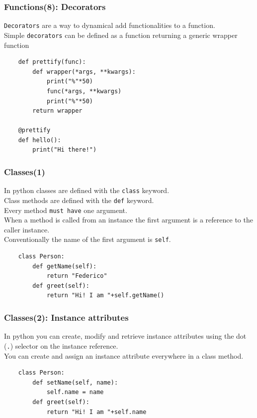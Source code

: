 \documentclass{beamer}
\begin{document}
\begin{frame}[fragile]
    \frametitle{Functions(8): Decorators}
    \texttt{Decorators} are a way to dynamical add functionalities to a function.\\
    Simple \texttt{decorators} can be defined as a function returning a generic wrapper function\\
    \begin{verbatim}
    def prettify(func):
        def wrapper(*args, **kwargs):
            print("%"*50)
            func(*args, **kwargs)
            print("%"*50)
        return wrapper

    @prettify
    def hello():
        print("Hi there!")
    \end{verbatim}
\end{frame}

\begin{frame}[fragile]
    \frametitle{Classes(1)}
    In python classes are defined with the \texttt{class} keyword.\\
    Class methods are defined with the \texttt{def} keyword.\\
    Every method \texttt{must have} one argument.\\
    When a method is called from an instance the first argument is a reference to the caller instance.\\
    Conventionally the name of the first argument is \texttt{self}.\\
    \begin{verbatim}
    class Person:
        def getName(self):
            return "Federico"
        def greet(self):
            return "Hi! I am "+self.getName()
    \end{verbatim}
\end{frame}

\begin{frame}[fragile]
    \frametitle{Classes(2): Instance attributes}
    In python you can create, modify and retrieve instance attributes using the dot (\texttt{.}) selector on the instance reference.\\
    You can create and assign an instance attribute everywhere in a class method.
    \begin{verbatim}
    class Person:
        def setName(self, name):
            self.name = name
        def greet(self):
            return "Hi! I am "+self.name
    \end{verbatim}
\end{frame}
\end{document}
